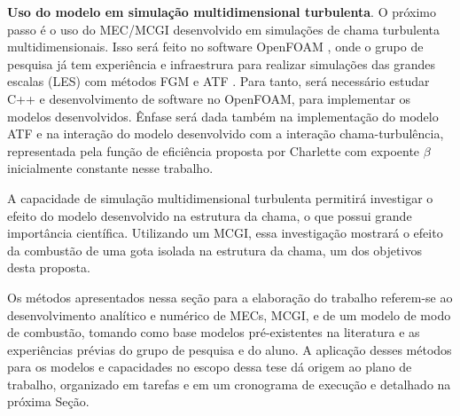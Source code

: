 
\textbf{Uso do modelo em simulação multidimensional turbulenta}.
O próximo passo é o uso do MEC/MCGI desenvolvido em simulações de chama turbulenta multidimensionais.
Isso será feito no software OpenFOAM \cite{JasakOpenFOAM}, onde o grupo de pesquisa já tem experiência e infraestrura para realizar simulações das grandes escalas (LES) com métodos FGM e ATF \cite{SacomanoF2017PhD,SacomanoF2017CF,SacomanoF2020CF}.
Para tanto, será necessário estudar C++ e desenvolvimento de software no OpenFOAM, para implementar os modelos desenvolvidos.
Ênfase será dada também na implementação do modelo ATF e na interação do modelo desenvolvido com a interação chama-turbulência, representada pela função de eficiência proposta por Charlette \cite{CharletteF2002} com expoente $\beta$ inicialmente constante nesse trabalho. 

A capacidade de simulação multidimensional turbulenta permitirá investigar o efeito do modelo desenvolvido na estrutura da chama, o que possui grande importância científica.
Utilizando um MCGI, essa investigação mostrará o efeito da combustão de uma gota isolada na estrutura da chama, um dos objetivos desta proposta.

Os métodos apresentados nessa seção para a elaboração do trabalho  referem-se ao desenvolvimento analítico e numérico de MECs, MCGI, e de um modelo de modo de combustão, tomando como base modelos pré-existentes na literatura e as experiências prévias do grupo de pesquisa e do aluno.
A aplicação desses métodos para os modelos e capacidades no escopo dessa tese dá origem ao plano de trabalho, organizado em tarefas e em um cronograma de execução e detalhado na próxima Seção.


